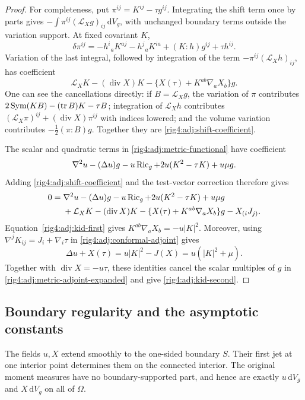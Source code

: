 \begin{proof}
For completeness, put $\pi^{ij}=K^{ij}-\tau g^{ij}$.  Integrating the shift
term once by parts gives
$-\int\pi^{ij}(\mathcal L_Xg)_{ij}\,\mathrm dV_g$, with unchanged boundary
terms outside the variation support.  At fixed covariant $K$,
\[
 \delta\pi^{ij}
 =-h^i{}_aK^{aj}-h^j{}_aK^{ia}
   +(K:h)g^{ij}+\tau h^{ij}.
\]
Variation of the last integral, followed by integration of the term
$-\pi^{ij}(\mathcal L_Xh)_{ij}$, has coefficient
\begin{equation}
 \mathcal L_XK-(\operatorname{div}X)K
  -\{X(\tau)+K^{ab}\nabla_aX_b\}g.
 \label{rig4:adj:shift-coefficient}
\end{equation}
One can see the cancellations directly: if $B=\mathcal L_Xg$, the variation
of $\pi$ contributes
$2\operatorname{Sym}(KB)-(\operatorname{tr} B)K-\tau B$; integration of $\mathcal L_Xh$ contributes
$(\mathcal L_X\pi)^{ij}+(\operatorname{div}X)\pi^{ij}$ with indices lowered;
and the volume variation contributes $-\tfrac12(\pi:B)g$.
Together they are \eqref{rig4:adj:shift-coefficient}.

The scalar and quadratic terms in \eqref{rig4:adj:metric-functional} have
coefficient
\[
 \nabla^2u-(\Delta u)g-u\operatorname{Ric}_g
       +2u(K^2-\tau K)+u\mu g.
\]
Adding \eqref{rig4:adj:shift-coefficient} and the test-vector correction therefore
gives
\begin{align}
 0={}&\nabla^2u-(\Delta u)g-u\operatorname{Ric}_g+2u(K^2-\tau K)+u\mu g
       \notag\\
    &+\mathcal L_XK-(\operatorname{div}X)K
      -\{X(\tau)+K^{ab}\nabla_aX_b\}g-X_{(i}J_{j)}.
 \label{rig4:adj:metric-adjoint-expanded}
\end{align}
Equation~\eqref{rig4:adj:kid-first} gives
$K^{ab}\nabla_aX_b=-u|K|^2$.  Moreover, using
$\nabla^jK_{ij}=J_i+\nabla_i\tau$ in
\eqref{rig4:adj:conformal-adjoint} gives
\begin{equation}
 \Delta u+X(\tau)
   =u|K|^2-J(X)=u(|K|^2+\mu).
 \label{rig4:adj:trace-identity}
\end{equation}
Together with $\operatorname{div}X=-u\tau$, these identities cancel the scalar
multiples of $g$ in \eqref{rig4:adj:metric-adjoint-expanded} and give
\eqref{rig4:adj:kid-second}.
\end{proof}

\subsection{Boundary regularity and the asymptotic constants}

\begin{lemma}
\label{rig4:adj:boundary-regularity}
The fields $u,X$ extend smoothly to the one-sided boundary $S$.  Their first
jet at one interior point determines them on the connected interior.
The original moment measures have no boundary-supported part, and hence are
exactly $u\,\mathrm dV_g$ and $X\,\mathrm dV_g$ on all of $\Omega$.
\end{lemma}

